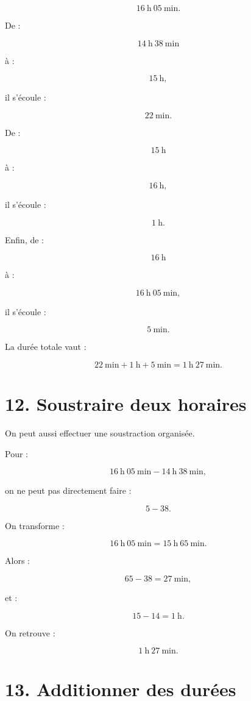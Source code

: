 \[
16\ \text{h}\ 05\ \text{min}.
\]

De :

\[
14\ \text{h}\ 38\ \text{min}
\]

à :

\[
15\ \text{h},
\]

il s’écoule :

\[
22\ \text{min}.
\]

De :

\[
15\ \text{h}
\]

à :

\[
16\ \text{h},
\]

il s’écoule :

\[
1\ \text{h}.
\]

Enfin, de :

\[
16\ \text{h}
\]

à :

\[
16\ \text{h}\ 05\ \text{min},
\]

il s’écoule :

\[
5\ \text{min}.
\]

La durée totale vaut :

\[
22\ \text{min}
+
1\ \text{h}
+
5\ \text{min}
=
1\ \text{h}\ 27\ \text{min}.
\]

\section{12. Soustraire deux horaires}

On peut aussi effectuer une soustraction organisée.

Pour :

\[
16\ \text{h}\ 05\ \text{min}
-
14\ \text{h}\ 38\ \text{min},
\]

on ne peut pas directement faire :

\[
5-38.
\]

On transforme :

\[
16\ \text{h}\ 05\ \text{min}
=
15\ \text{h}\ 65\ \text{min}.
\]

Alors :

\[
65-38=27\ \text{min},
\]

et :

\[
15-14=1\ \text{h}.
\]

On retrouve :

\[
1\ \text{h}\ 27\ \text{min}.
\]

\section{13. Additionner des durées}

